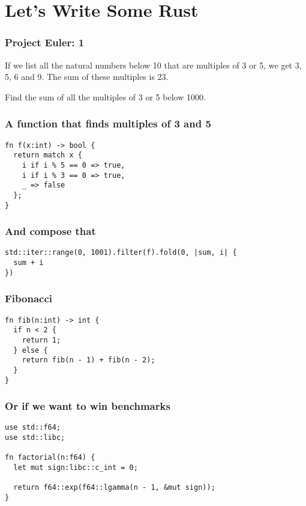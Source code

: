 \documentclass{beamer}
\begin{document}
\section{Let's Write Some Rust}

\begin{frame}
  \frametitle{Project Euler: 1}

  If we list all the natural numbers below 10 that are multiples of 3 or 5, we get 3, 5, 6 and 9. The sum of these multiples is 23.

  Find the sum of all the multiples of 3 or 5 below 1000.
\end{frame}



\begin{frame}[fragile]
  \frametitle{A function that finds multiples of 3 and 5}

  \begin{verbatim}
fn f(x:int) -> bool {
  return match x {
    i if i % 5 == 0 => true,
    i if i % 3 == 0 => true,
    _ => false
  };
}
  \end{verbatim}
\end{frame}



\begin{frame}[fragile]
  \frametitle{And compose that}

  \begin{verbatim}
std::iter::range(0, 1001).filter(f).fold(0, |sum, i| {
  sum + i
})
  \end{verbatim}
\end{frame}



\begin{frame}[fragile]
  \frametitle{Fibonacci}

  \begin{verbatim}
fn fib(n:int) -> int {
  if n < 2 {
    return 1;
  } else {
    return fib(n - 1) + fib(n - 2);
  }
}
  \end{verbatim}
\end{frame}



\begin{frame}[fragile]
  \frametitle{Or if we want to win benchmarks}
  
  \begin{verbatim}
use std::f64;
use std::libc;

fn factorial(n:f64) {
  let mut sign:libc::c_int = 0;

  return f64::exp(f64::lgamma(n - 1, &mut sign));
}
  \end{verbatim}
\end{frame}
\end{document}
